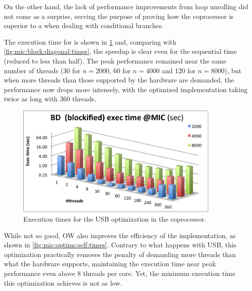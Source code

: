 \documentclass[../thesis]{subfiles}
\begin{document}
	On the other hand, the lack of performance improvements from loop unrolling did not come as a surprise, serving the purpose of proving how the \intel\xeonphi coprocessor is superior to a \gpu when dealing with conditional branches.

	The execution time for \usb is shown in \cref{fig:mic:optims:blockified:times} and, comparing with \cref{fig:mic:block:diagonal:times}, the speedup is clear even for the sequential time (reduced to less than half). The peak performance remained near the same number of threads (30 for $n=2000$, 60 for $n=4000$ and 120 for $n=8000$), but when more threads than those supported by the hardware are demanded, the performance now drops more intensely, with the optimized implementation taking twice as long with 360 threads.

	\begin{figure}[p]
		\begin{center}
			\includegraphics[width=0.9\textwidth]{assets/images/mic/optims/mic-blockified.png}
		\end{center}
		\caption{Execution times for the USB optimization in the \intel\xeonphi coprocessor.}
		\label{fig:mic:optims:blockified:times}
	\end{figure}

	While not so good, OW also improves the efficiency of the implementation, as shown in \cref{fig:mic:optims:self:times}. Contrary to what happens with USB, this optimization practically removes the penalty of demanding more threads than what the hardware supports, maintaining the execution time near peak performance even above 8 threads per core. Yet, the minimum execution time this optimization achieves is not as low.
\end{document}
